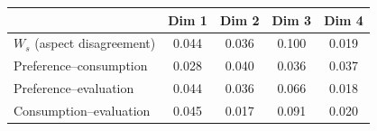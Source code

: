 \begin{tabular}{lcccc}
\toprule
 & Dim 1 & Dim 2 & Dim 3 & Dim 4 \\
\midrule
$W_s$ (aspect disagreement) & 0.044 & 0.036 & 0.100 & 0.019 \\
\midrule
Preference--consumption & 0.028 & 0.040 & 0.036 & 0.037 \\
Preference--evaluation & 0.044 & 0.036 & 0.066 & 0.018 \\
Consumption--evaluation & 0.045 & 0.017 & 0.091 & 0.020 \\
\bottomrule
\end{tabular}

